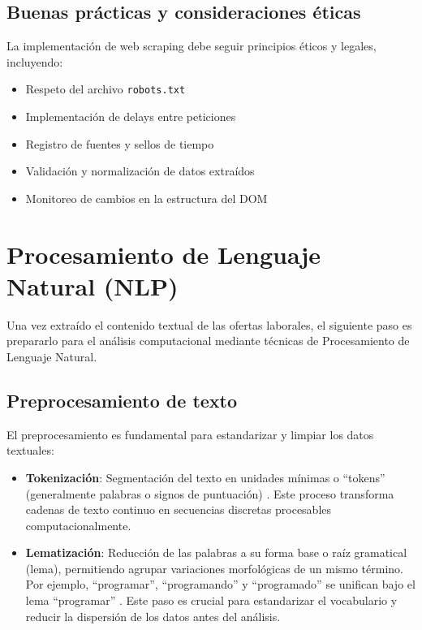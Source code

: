 \subsection{Buenas prácticas y consideraciones éticas}

La implementación de web scraping debe seguir principios éticos y legales, incluyendo:

\begin{itemize}
    \item Respeto del archivo \texttt{robots.txt}
    \item Implementación de delays entre peticiones
    \item Registro de fuentes y sellos de tiempo
    \item Validación y normalización de datos extraídos
    \item Monitoreo de cambios en la estructura del DOM
\end{itemize}

\section{Procesamiento de Lenguaje Natural (NLP)}

Una vez extraído el contenido textual de las ofertas laborales, el siguiente paso es prepararlo para el análisis computacional mediante técnicas de Procesamiento de Lenguaje Natural.

\subsection{Preprocesamiento de texto}

El preprocesamiento es fundamental para estandarizar y limpiar los datos textuales:

\begin{itemize}
    \item \textbf{Tokenización}: Segmentación del texto en unidades mínimas o ``tokens'' (generalmente palabras o signos de puntuación) \parencite{nguyen2024}. Este proceso transforma cadenas de texto continuo en secuencias discretas procesables computacionalmente.

    \item \textbf{Lematización}: Reducción de las palabras a su forma base o raíz gramatical (lema), permitiendo agrupar variaciones morfológicas de un mismo término. Por ejemplo, ``programar'', ``programando'' y ``programado'' se unifican bajo el lema ``programar'' \parencite{echeverria2022}. Este paso es crucial para estandarizar el vocabulario y reducir la dispersión de los datos antes del análisis.
\end{itemize}

